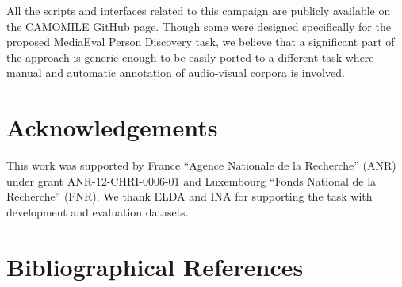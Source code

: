 \documentclass[10pt, a4paper]{article}
\begin{document}
All the scripts and interfaces related to this campaign are publicly available
on the CAMOMILE GitHub page. Though some were designed specifically for the
proposed MediaEval Person Discovery task, we believe that a significant part of
the approach is generic enough to be easily ported to a different task
where manual and automatic annotation of audio-visual corpora is involved.

\section{Acknowledgements}

This work was supported by France ``Agence Nationale de la Recherche''
(ANR) under grant ANR-12-CHRI-0006-01 and Luxembourg ``Fonds National de la
Recherche'' (FNR). We thank ELDA and INA for supporting the task with
development and evaluation datasets.


\section{Bibliographical References}
\label{main:ref}



\end{document}
